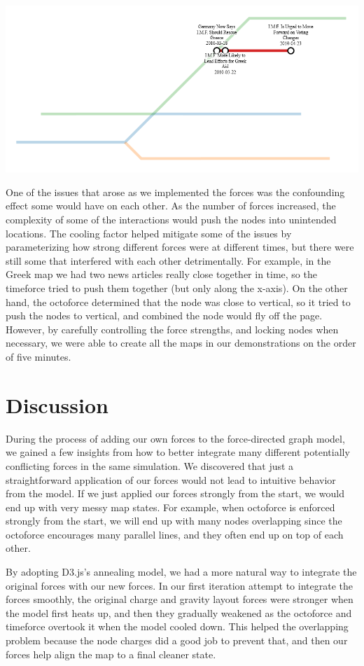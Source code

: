 \documentclass{chi2009}
\begin{document}
\includegraphics[width=\columnwidth]{Metro4.png}

One of the issues that arose as we implemented the forces was the confounding effect some would have on each other.  As the number of forces increased, the complexity of some of the interactions would push the nodes into unintended locations.  The cooling factor helped mitigate some of the issues by parameterizing how strong different forces were at different times, but there were still some that interfered with each other detrimentally.  For example, in the Greek map we had two news articles really close together in time, so the timeforce tried to push them together (but only along the x-axis).  On the other hand, the octoforce determined that the node was close to vertical, so it tried to push the nodes to vertical, and combined the node would fly off the page.  However, by carefully controlling the force strengths, and locking nodes when necessary, we were able to create all the maps in our demonstrations on the order of five minutes.  

\section{Discussion}

During the process of adding our own forces to the force-directed graph model, we gained a few insights from how to better integrate many different potentially conflicting forces in the same simulation.  We discovered that just a straightforward application of our forces would not lead to intuitive behavior from the model.  If we just applied our forces strongly from the start, we would end up with very messy map states.  For example, when octoforce is enforced strongly from the start, we will end up with many nodes overlapping since the octoforce encourages many parallel lines, and they often end up on top of each other.  

By adopting D3.js’s annealing model, we had a more natural way to integrate the original forces with our new forces.  In our first iteration attempt to integrate the forces smoothly, the original charge and gravity layout forces were stronger when the model first heats up, and then they gradually weakened as the octoforce and timeforce overtook it when the model cooled down.  This helped the overlapping problem because the node charges did a good job to prevent that, and then our forces help align the map to a final cleaner state.  
\end{document}

